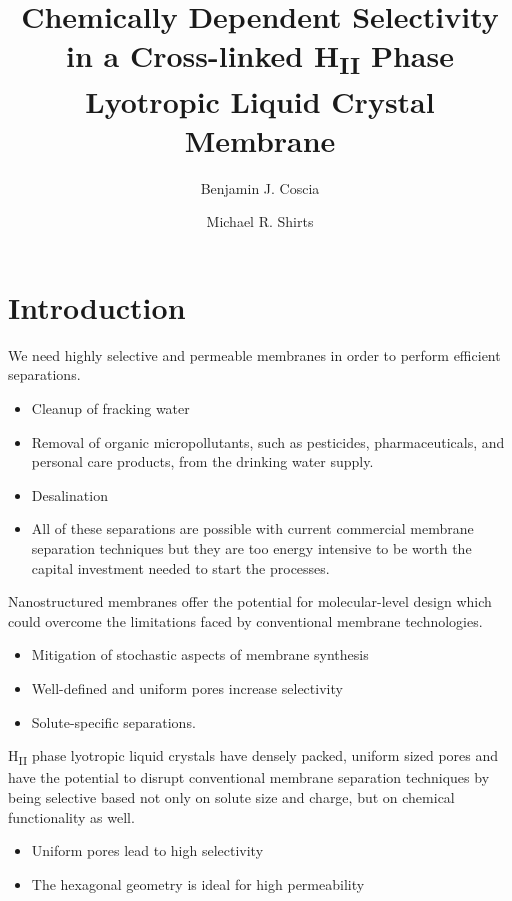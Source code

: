 \documentclass{article}
\title{Chemically Dependent Selectivity in a Cross-linked H\textsubscript{II} Phase Lyotropic Liquid Crystal Membrane}
\author{Benjamin J. Coscia \and Michael R. Shirts}
\begin{document}
  \graphicspath{{./figures/}}
  \maketitle

  \section{Introduction}

  We need highly selective and permeable membranes in order to perform efficient 
  separations.
  \begin{itemize}
    \item Cleanup of fracking water
    \item Removal of organic micropollutants, such as pesticides, pharmaceuticals,
    and personal care products, from the drinking water supply.
    \item Desalination
    \item All of these separations are possible with current commercial membrane
    separation techniques but they are too energy intensive to be worth the 
    capital investment needed to start the processes.
  \end{itemize}
  
  Nanostructured membranes offer the potential for molecular-level design which
  could overcome the limitations faced by conventional membrane technologies.
  \begin{itemize}
    \item Mitigation of stochastic aspects of membrane synthesis
    \item Well-defined and uniform pores increase selectivity
    \item Solute-specific separations.
  \end{itemize} 

  H\textsubscript{II} phase lyotropic liquid crystals have densely packed, uniform
  sized pores and have the potential to disrupt conventional membrane separation
  techniques by being selective based not only on solute size and charge, but on 
  chemical functionality as well.
  \begin{itemize}
    \item Uniform pores lead to high selectivity
    \item The hexagonal geometry is ideal for high permeability
  \end{itemize}
\end{document}
